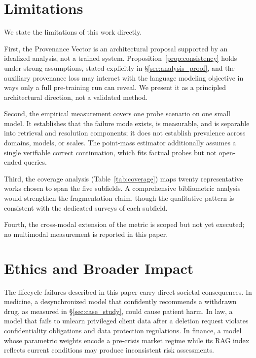 \documentclass{article}
\begin{document}
\section{Limitations}
\label{sec:limitations}

We state the limitations of this work directly.

First, the Provenance Vector is an architectural proposal supported by an idealized analysis, not a trained system. Proposition~\ref{prop:consistency} holds under strong assumptions, stated explicitly in \S\ref{sec:analysis_proof}, and the auxiliary provenance loss may interact with the language modeling objective in ways only a full pre-training run can reveal. We present it as a principled architectural direction, not a validated method.

Second, the empirical measurement covers one probe scenario on one small model. It establishes that the failure mode exists, is measurable, and is separable into retrieval and resolution components; it does not establish prevalence across domains, models, or scales. The point-mass estimator additionally assumes a single verifiable correct continuation, which fits factual probes but not open-ended queries.

Third, the coverage analysis (Table~\ref{tab:coverage}) maps twenty representative works chosen to span the five subfields. A comprehensive bibliometric analysis would strengthen the fragmentation claim, though the qualitative pattern is consistent with the dedicated surveys of each subfield.

Fourth, the cross-modal extension of the metric is scoped but not yet executed; no multimodal measurement is reported in this paper.

\section{Ethics and Broader Impact}
\label{sec:ethics}

The lifecycle failures described in this paper carry direct societal consequences. In medicine, a desynchronized model that confidently recommends a withdrawn drug, as measured in \S\ref{sec:case_study}, could cause patient harm. In law, a model that fails to unlearn privileged client data after a deletion request violates confidentiality obligations and data protection regulations. In finance, a model whose parametric weights encode a pre-crisis market regime while its RAG index reflects current conditions may produce inconsistent risk assessments.
\end{document}
